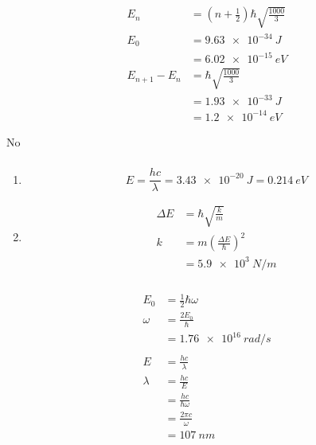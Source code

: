 \documentclass{article}
\begin{document}
\setcounter{subsubsection}{32}
\subsubsection{}

\begin{align*}
  E_n             & = \left( n + \frac{1}{2} \right) \hbar \sqrt{\frac{1000}{3}} \\
  E_0             & = \qty{9.63e-34}{J}                                          \\
                  & = \qty{6.02e-15}{eV}                                         \\
  E_{n + 1} - E_n & = \hbar \sqrt{\frac{1000}{3}}                                \\
                  & = \qty{1.93e-33}{J}                                          \\
                  & = \qty{1.2e-14}{eV}
\end{align*}

No

\setcounter{subsubsection}{34}
\subsubsection{}

\begin{enumerate}
  \item \[E = \frac{h c}{\lambda} = \qty{3.43e-20}{J} = \qty{0.214}{eV}\]

  \item

        \begin{align*}
          \Delta E & = \hbar \sqrt{\frac{k}{m}}                  \\
          k        & = m \left( \frac{\Delta E}{\hbar} \right)^2 \\
                   & = \qty{5.9e3}{N/m}
        \end{align*}
\end{enumerate}

\setcounter{subsubsection}{36}
\subsubsection{}

\begin{align*}
  E_0     & = \frac{1}{2} \hbar \omega \\
  \omega  & = \frac{2 E_0}{\hbar}      \\
          & = \qty{1.76e16}{rad/s}     \\ \\
  E       & = \frac{h c}{\lambda}      \\
  \lambda & = \frac{h c}{E}            \\
          & = \frac{h c}{\hbar \omega} \\
          & = \frac{2 \pi c}{\omega}   \\
          & = \qty{107}{nm}
\end{align*}
\end{document}

